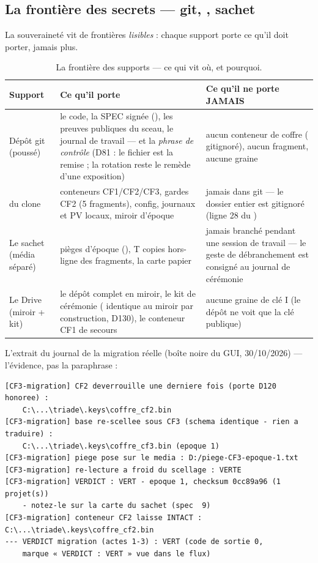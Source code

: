 \subsection{La frontière des secrets — git, , sachet}\label{sec:frontiere}

La souveraineté vit de frontières \emph{lisibles} : chaque support porte ce qu'il doit
porter, jamais plus.

\begin{table}[htbp]
\centering\small
\caption{La frontière des supports — ce qui vit où, et pourquoi.}
\label{tab:frontiere}
\begin{tabularx}{\textwidth}{@{}l Y Y@{}}
\toprule
\textbf{Support} & \textbf{Ce qu'il porte} & \textbf{Ce qu'il ne porte JAMAIS} \\
\midrule
Dépôt git (poussé) & le code, la SPEC signée (), les preuves publiques du
sceau, le journal de travail — et la \emph{phrase de contrôle} (D81 : le fichier est la
remise ; la rotation reste le remède d'une exposition) & aucun conteneur de coffre
( gitignoré), aucun fragment, aucune graine \\
 du clone & conteneurs CF1/CF2/CF3, gardes CF2 (5 fragments), config,
journaux et PV locaux, miroir d'époque & jamais dans git — le dossier entier est
gitignoré (ligne 28 du ) \\
Le sachet (média séparé) & pièges d'époque (), T copies
hors-ligne des fragments, la carte papier & jamais branché pendant une session de
travail — le geste de débranchement est consigné au journal de cérémonie \\
Le Drive (miroir + kit) & le dépôt complet en miroir, le kit de cérémonie
( identique au miroir par construction, D130), le conteneur CF1 de secours &
aucune graine de clé I (le dépôt ne voit que la clé publique) \\
\bottomrule
\end{tabularx}
\end{table}

L'extrait du journal de la migration réelle (boîte noire du GUI, 30/10/2026) —
l'évidence, pas la paraphrase :

\begin{lstlisting}
[CF3-migration] CF2 deverrouille une derniere fois (porte D120 honoree) :
    C:\...\triade\.keys\coffre_cf2.bin
[CF3-migration] base re-scellee sous CF3 (schema identique - rien a traduire) :
    C:\...\triade\.keys\coffre_cf3.bin (epoque 1)
[CF3-migration] piege pose sur le media : D:/piege-CF3-epoque-1.txt
[CF3-migration] re-lecture a froid du scellage : VERTE
[CF3-migration] VERDICT : VERT - epoque 1, checksum 0cc89a96 (1 projet(s))
    - notez-le sur la carte du sachet (spec  9)
[CF3-migration] conteneur CF2 laisse INTACT : C:\...\triade\.keys\coffre_cf2.bin
--- VERDICT migration (actes 1-3) : VERT (code de sortie 0,
    marque « VERDICT : VERT » vue dans le flux)
\end{lstlisting}


